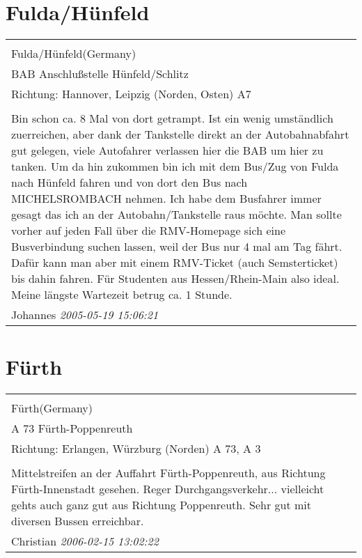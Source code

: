 \documentclass[a4paper,12pt]{article}
\begin{document}
\section{Fulda/Hünfeld}
\begin{tabular}{|p{13cm}|}
\hline\\
Fulda/Hünfeld(Germany)\\
BAB Anschlußstelle Hünfeld/Schlitz\\
Richtung: Hannover, Leipzig (Norden, Osten) A7 \\
\hline\\
Bin schon ca. 8 Mal von dort getrampt. Ist ein wenig umständlich zuerreichen, aber dank der Tankstelle direkt an der Autobahnabfahrt gut gelegen, viele Autofahrer verlassen hier die BAB um hier zu tanken.
Um da hin zukommen bin ich mit dem Bus/Zug von Fulda nach Hünfeld fahren und von dort den Bus nach MICHELSROMBACH nehmen. Ich habe dem Busfahrer immer gesagt das ich an der Autobahn/Tankstelle raus möchte.
Man sollte vorher auf jeden Fall über die RMV-Homepage sich eine Busverbindung suchen lassen, weil der Bus nur 4 mal am Tag fährt. Dafür kann man aber mit einem RMV-Ticket (auch Semsterticket) bis dahin fahren.
Für Studenten aus Hessen/Rhein-Main also ideal.
Meine längste Wartezeit betrug ca. 1 Stunde. \\
Johannes \textit{ 2005-05-19 15:06:21 }\\\hline
\end{tabular}


\section{Fürth}
\begin{tabular}{|p{13cm}|}
\hline\\
Fürth(Germany)\\
A 73 Fürth-Poppenreuth\\
Richtung: Erlangen, Würzburg (Norden) A 73, A 3 \\
\hline\\
Mittelstreifen an der Auffahrt Fürth-Poppenreuth, aus Richtung Fürth-Innenstadt gesehen. Reger Durchgangsverkehr... vielleicht gehts auch ganz gut aus Richtung Poppenreuth. Sehr gut mit diversen Bussen erreichbar. \\
Christian \textit{ 2006-02-15 13:02:22 }\\\hline
\end{tabular}
\end{document}

